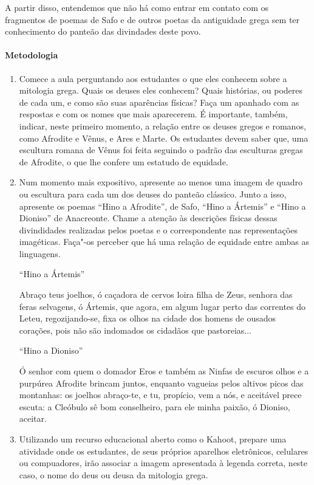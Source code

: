 \documentclass[12pt]{extarticle}
\begin{document}
A partir disso, entendemos que não há como entrar em contato com os fragmentos 
de poemas de Safo e de outros poetas da antiguidade grega sem ter conhecimento 
do panteão das divindades deste povo.

\paragraph{Metodologia}

\begin{enumerate}

	\item
	Comece a aula perguntando aos estudantes o que eles conhecem sobre 
	a mitologia grega. Quais os deuses eles conhecem? Quais histórias,
	ou poderes de cada um, e como são suas aparências físicas? Faça um apanhado
	com as respostas e com os nomes que mais aparecerem. É importante, também,
	indicar, neste primeiro momento, a relação entre os deuses gregos e romanos,
	como Afrodite e Vênus, e Ares e Marte. Os estudantes devem saber que, uma escultura
	romana de Vênus foi feita seguindo o padrão das esculturas gregas de Afrodite,
	o que lhe confere um estatudo de equidade. 

	\item
	Num momento mais expositivo, apresente ao menos uma imagem de quadro ou escultura
	para cada um dos deuses do panteão clássico.  Junto a isso, apresente os poemas
	``Hino a Afrodite'', de Safo, ``Hino a Ártemis'' e ``Hino a Dioniso'' de Anacreonte.
	Chame a atenção às descrições físicas dessas divindidades realizadas pelos poetas
	e o correspondente nas representações imagéticas. Faça"-os perceber que há uma
	relação de equidade entre ambas as linguagens. 

 	``Hino a Ártemis''

	Abraço teus joelhos, ó caçadora de cervos
	loira filha de Zeus, senhora 
	das feras selvagens, ó Ártemis,
	que agora, em algum lugar perto
	das correntes do Leteu, regozijando-se,
	fixa os olhos na cidade dos homens
	de ousados corações, pois não são indomados
	os cidadãos que pastoreias...

	``Hino a Dioniso''

	Ó senhor com quem o domador Eros
	e também as Ninfas de escuros olhos 
	e a purpúrea Afrodite
	brincam juntos, enquanto vagueias 
	pelos altivos picos das montanhas:
	os joelhos abraço-te, e tu, propício,
	vem a nós, e aceitável
	prece escuta:
	a Cleóbulo sê bom
	conselheiro, para ele minha paixão,
	ó Dioniso, aceitar. 

	\item
	Utilizando um recurso educacional aberto como o Kahoot, prepare uma atividade onde os
	estudantes, de seus próprios aparelhos eletrônicos, celulares ou compuadores, irão 
	associar a imagem apresentada à legenda correta, neste caso, o nome do deus ou deusa 
	da mitologia grega. 

\end{enumerate}
\end{document}
